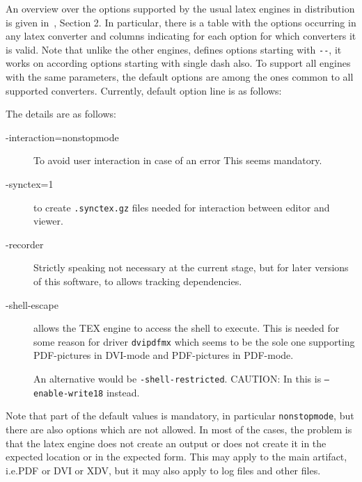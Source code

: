 An overview over the options supported by the usual latex engines in distribution \texlive{} 
is given in~\cite{LatexGen}, Section 2. 
In particular, there is a table with the options occurring in any latex converter 
and columns indicating for each option for which converters it is valid. 
Note that unlike the other engines, \lualatex{} defines options starting with \texttt{-{}-}, 
it works on according options starting with single dash also. 
To support all engines with the same parameters, 
the default options are among the ones common to all supported converters. 
Currently, default option line is as follows: 
%
\begin{center}
  \texttt{\latexToPdfOptions}
\end{center}
%
The details are as follows: 
%
\begin{description}
  \item[-interaction=nonstopmode] To avoid user interaction in case of an error 
  This seems mandatory. 
  \item[-synctex=1] to create \texttt{.synctex.gz} files needed for interaction between editor and viewer. 
  \item[-recorder] Strictly speaking not necessary at the current stage, 
    but for later versions of this software, to allows tracking dependencies. 
  \item[-shell-escape] allows the TEX engine to access the shell to execute. 
  This is needed for some reason for driver \texttt{dvipdfmx} 
  which seems to be the sole one supporting 
  PDF-pictures in DVI-mode and PDF-pictures in PDF-mode. 

  An alternative would be \texttt{-shell-restricted}. 
  CAUTION\@: In \miktex{} this is \texttt{--enable-write18} instead. 
\end{description}


Note that part of the default values is mandatory, in particular \texttt{nonstopmode}, 
but there are also options which are not allowed. 
In most of the cases, the problem is that the latex engine does not create an output 
or does not create it in the expected location or in the expected form. 
This may apply to the main artifact, i.e.\@ PDF or DVI or XDV, 
but it may also apply to log files and other files. 

